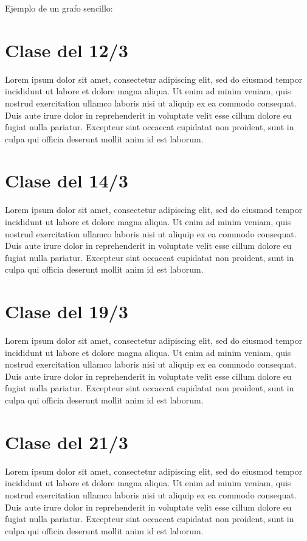 \documentclass{article}
\begin{document}
Ejemplo de un grafo sencillo:
\begin{center}
\end{center}

\section*{Clase del 12/3}
Lorem ipsum dolor sit amet, consectetur adipiscing elit, sed do eiusmod tempor incididunt ut labore et dolore magna aliqua. Ut enim ad minim veniam, quis nostrud exercitation ullamco laboris nisi ut aliquip ex ea commodo consequat. Duis aute irure dolor in reprehenderit in voluptate velit esse cillum dolore eu fugiat nulla pariatur. Excepteur sint occaecat cupidatat non proident, sunt in culpa qui officia deserunt mollit anim id est laborum.
\newpage

\section*{Clase del 14/3}
Lorem ipsum dolor sit amet, consectetur adipiscing elit, sed do eiusmod tempor incididunt ut labore et dolore magna aliqua. Ut enim ad minim veniam, quis nostrud exercitation ullamco laboris nisi ut aliquip ex ea commodo consequat. Duis aute irure dolor in reprehenderit in voluptate velit esse cillum dolore eu fugiat nulla pariatur. Excepteur sint occaecat cupidatat non proident, sunt in culpa qui officia deserunt mollit anim id est laborum.
\newpage

\section*{Clase del 19/3}
Lorem ipsum dolor sit amet, consectetur adipiscing elit, sed do eiusmod tempor incididunt ut labore et dolore magna aliqua. Ut enim ad minim veniam, quis nostrud exercitation ullamco laboris nisi ut aliquip ex ea commodo consequat. Duis aute irure dolor in reprehenderit in voluptate velit esse cillum dolore eu fugiat nulla pariatur. Excepteur sint occaecat cupidatat non proident, sunt in culpa qui officia deserunt mollit anim id est laborum.
\newpage

\section*{Clase del 21/3}
Lorem ipsum dolor sit amet, consectetur adipiscing elit, sed do eiusmod tempor incididunt ut labore et dolore magna aliqua. Ut enim ad minim veniam, quis nostrud exercitation ullamco laboris nisi ut aliquip ex ea commodo consequat. Duis aute irure dolor in reprehenderit in voluptate velit esse cillum dolore eu fugiat nulla pariatur. Excepteur sint occaecat cupidatat non proident, sunt in culpa qui officia deserunt mollit anim id est laborum.
\end{document}
